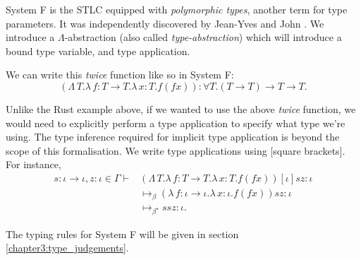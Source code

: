 System F is the STLC equipped with \textit{polymorphic types}, another term for type parameters. It
was independently discovered by Jean-Yves \citet{girard_interpretation_1972} and John
\citet{goos_towards_1974}. We introduce a $\Lambda$-abstraction (also called \textit{type-abstraction}) which will introduce a bound type variable, and type application.

We can write this \textit{twice} function like so in System F:
\begin{equation*}
  (\Lambda \, T. \lambda \, f \colon T \to T . \lambda \, x \colon T . f (f x))
  \colon \forall T . (T \to T) \to T \to T.
\end{equation*}

Unlike the Rust example above, if we wanted to use the above \textit{twice} function, we would need
to explicitly perform a type application to specify what type we're using. The type inference
required for implicit type application is beyond the scope of this formalisation. We write type
applications using [square brackets]. For instance,
\begin{align*}
  s \colon \iota \to \iota, z \colon \iota \in \Gamma \vdash
    &(\Lambda \, T. \lambda \, f \colon T \to T . \lambda \, x \colon T . f (f x))
    [\iota] s z \colon \iota\\
  &\mapsto_{\beta}
    (\lambda \, f \colon \iota \to \iota . \lambda \, x \colon \iota . f (f x)) s z \colon \iota\\
  &\mapsto_{\beta^{\star}} s s z \colon \iota.
\end{align*}

The typing rules for System F will be given in section \ref{chapter3:type_judgements}.
